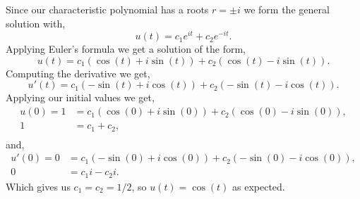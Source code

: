 \documentclass[12pt]{article}
\makeatletter
\theoremstyle{homework}
\newenvironment{exercise}[1]
{\def\@currentlabel{#1}\exercisecore}
{\endexercisecore}
\makeatother
\begin{document}
\begin{exercise}{Problem P27}
\begin{enumerate}
    Since our characteristic polynomial has a roots $r = \pm i$ we form the general solution with, 
    \begin{equation*}
      u(t) = c_1e^{it} + c_2e^{-it}. 
    \end{equation*}
    Applying Euler's formula we get a solution of the form, 
    \begin{equation*}
      u(t) = c_1(\cos(t) + i\sin(t)) + c_2(\cos(t) - i\sin(t)).
    \end{equation*}
    Computing the derivative we get, 
    \begin{equation*}
      u'(t) = c_1(-\sin(t) + i\cos(t)) + c_2(-\sin(t) - i\cos(t)).
    \end{equation*}
    Applying our initial values we get, 
    \begin{align*}
      u(0) = 1 &=  c_1(\cos(0) + i\sin(0)) + c_2(\cos(0) - i\sin(0)),\\
        1 &=  c_1 + c_2,\\
    \end{align*}
    and, 
    \begin{align*}
      u'(0)= 0 &= c_1(-\sin(0) + i\cos(0)) + c_2(-\sin(0) - i\cos(0)),\\
      0&= c_1i - c_2i.
    \end{align*}
    Which gives us $c_1 = c_2 = 1/2$, so $u(t) = \cos(t)$ as expected. 



\end{enumerate}
\end{exercise}
\end{document}

